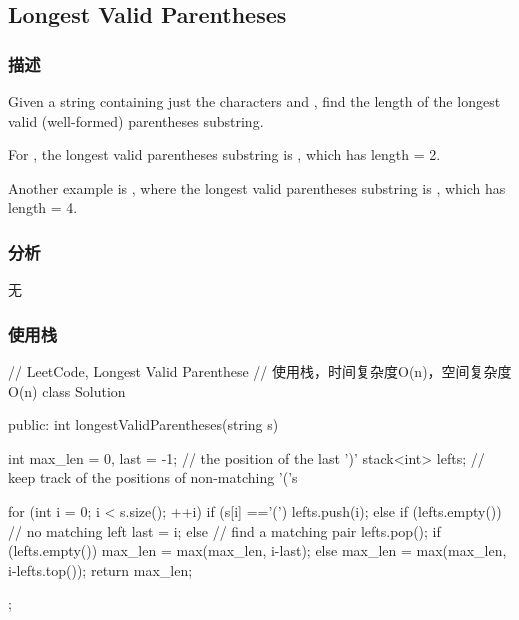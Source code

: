 \subsection{Longest Valid Parentheses} %
\label{sec:longest-valid-parentheses}


\subsubsection{描述}
Given a string containing just the characters  and , find the length of the longest valid (well-formed) parentheses substring.

For , the longest valid parentheses substring is , which has length = 2.

Another example is , where the longest valid parentheses substring is , which has length = 4.


\subsubsection{分析}
无


\subsubsection{使用栈}
\begin{Code}
// LeetCode, Longest Valid Parenthese
// 使用栈，时间复杂度O(n)，空间复杂度O(n)
class Solution {
public:
    int longestValidParentheses(string s) {
        int max_len = 0, last = -1; // the position of the last ')'
        stack<int> lefts;  // keep track of the positions of non-matching '('s

        for (int i = 0; i < s.size(); ++i) {
            if (s[i] =='(') {
                lefts.push(i);
            } else {
                if (lefts.empty()) {
                    // no matching left
                    last = i;
                } else {
                    // find a matching pair
                    lefts.pop();
                    if (lefts.empty()) {
                        max_len = max(max_len, i-last);
                    } else {
                        max_len = max(max_len, i-lefts.top());
                    }
                }
            }
        }
        return max_len;
    }
};
\end{Code}

